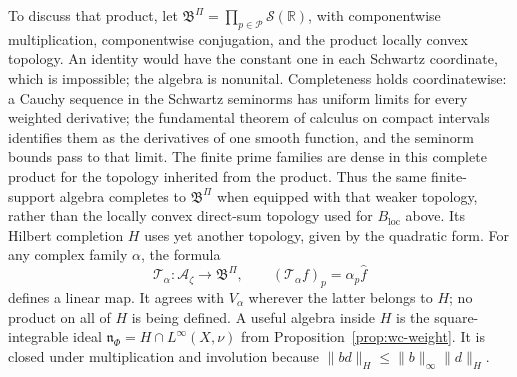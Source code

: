 \documentclass[11pt]{article}
\theoremstyle{definition}
\theoremstyle{remark}
\numberwithin{equation}{section}
\newcommand{\cA}{\mathcal A}
\newcommand{\R}{\mathbb R}
\begin{document}
To discuss that product, let
$\mathfrak B^\Pi=\prod_{p\in\mathcal P}\mathscr S(\R)$,
with componentwise multiplication, componentwise conjugation, and the
product locally convex topology.
An identity would have the constant one in each Schwartz coordinate,
which is impossible; the algebra is nonunital.
Completeness holds coordinatewise: a Cauchy sequence in the Schwartz
seminorms has uniform limits for every weighted derivative; the
fundamental theorem of calculus on compact intervals identifies them
as the derivatives of one smooth function, and the seminorm bounds
pass to that limit.  The finite prime families are dense in this
complete product for the topology inherited from the product.  Thus the
same finite-support algebra completes to $\mathfrak B^\Pi$ when equipped
with that weaker topology, rather than the locally convex direct-sum
topology used for $B_{\mathrm{loc}}$ above.  Its Hilbert completion $H$
uses yet another topology, given by the quadratic form.
For any complex family $\alpha$, the formula
\[
 \mathcal T_\alpha:\cA_\zeta\longrightarrow\mathfrak B^\Pi,
 \qquad (\mathcal T_\alpha f)_p=\alpha_p\widehat f
\]
defines a linear map.
It agrees with $V_\alpha$ wherever the latter belongs to $H$;
no product on all of $H$ is being defined.
A useful algebra inside $H$ is the square-integrable ideal
$\mathfrak n_\Phi=H\cap L^\infty(X,\nu)$ from
Proposition~\ref{prop:wc-weight}.
It is closed under multiplication and involution because
$\|bd\|_H\leq\|b\|_\infty\|d\|_H$.
\end{document}
